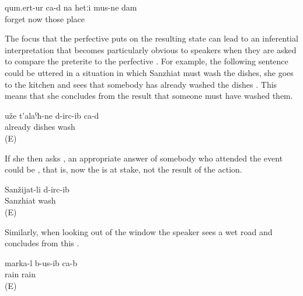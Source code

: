 \begin{exe}
	\ex	\label{ex:Now I have forgotten those places analytic}
	\gll	qum.ert-ur ca-d	na	hetːi	mus-ne	dam\\
		forget 	now	those	place	\\
	\glt	{}
\end{exe}


The focus that the perfective  puts on the resulting state can lead to an inferential interpretation that becomes particularly obvious to speakers when they are asked to compare the preterite to the perfective . For example, the following sentence could be uttered in a situation in which Sanzhiat must wash the dishes, she goes to the kitchen and sees that somebody has already washed the dishes . This means that she concludes from the result that someone must have washed them.

\begin{exe}
	\ex	\label{ex:The dishes have already been washed}
	\gll	uže	t'alaˁħ-ne	d-irc-ib	ca-d\\
		already	dishes	wash	\\
	\glt	{} (E)
\end{exe}

If she then asks  , an appropriate answer of somebody who attended the event could be , that is, now the  is at stake, not the result of the action.

\begin{exe}
	\ex	\label{ex:Sanzhiat washed (them)}
	\gll	Sanžijat-li	d-irc-ib\\
		Sanzhiat	wash\\
	\glt	{} (E)
\end{exe}

Similarly, when looking out of the window the speaker sees a wet road and concludes from this .

\begin{exe}
	\ex	\label{ex:It has rained analytic}
	\gll	marka-l	b-us-ib	ca-b\\
		rain	rain	\\
	\glt	{} (E)
\end{exe}


